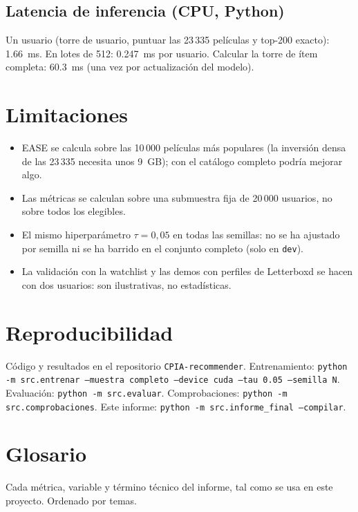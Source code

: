 \subsection{Latencia de inferencia (CPU, Python)}
Un usuario (torre de usuario, puntuar las 23\,335 películas y top-200 exacto): 1.66~ms. En lotes de 512: 0.247~ms por usuario. Calcular la torre de ítem completa: 60.3~ms (una vez por actualización del modelo).

\section{Limitaciones}
\begin{itemize}
\item EASE se calcula sobre las 10\,000 películas más populares (la inversión densa de las 23\,335 necesita unos 9~GB); con el catálogo completo podría mejorar algo.
\item Las métricas se calculan sobre una submuestra fija de 20\,000 usuarios, no sobre todos los elegibles.
\item El mismo hiperparámetro $\tau=0{,}05$ en todas las semillas: no se ha ajustado por semilla ni se ha barrido en el conjunto completo (solo en \texttt{dev}).
\item La validación con la watchlist y las demos con perfiles de Letterboxd se hacen con dos usuarios: son ilustrativas, no estadísticas.
\end{itemize}
\section{Reproducibilidad}
Código y resultados en el repositorio \texttt{CPIA-recommender}. Entrenamiento: \texttt{python -m src.entrenar --muestra completo --device cuda --tau 0.05 --semilla N}. Evaluación: \texttt{python -m src.evaluar}.
Comprobaciones: \texttt{python -m src.comprobaciones}. Este informe: \texttt{python -m src.informe\_final --compilar}.

\section{Glosario}
Cada métrica, variable y término técnico del informe, tal como se usa en este proyecto. Ordenado por temas.

